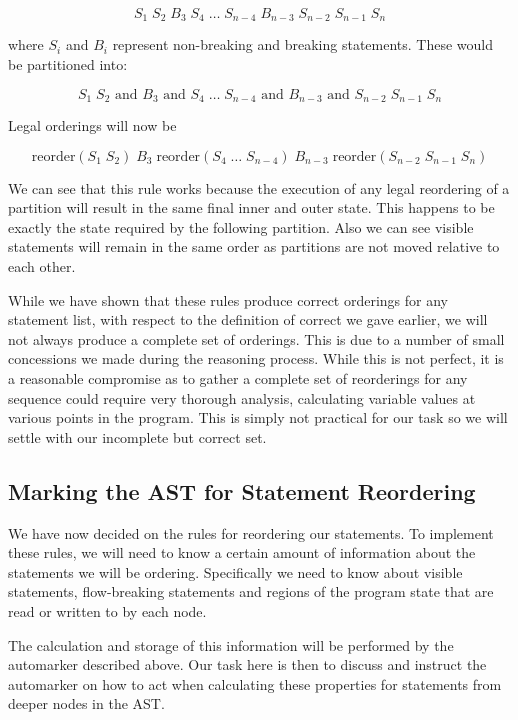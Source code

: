 \documentclass[twoside,a4paper]{report}
\begin{document}
$$S_1 \; S_2 \; B_3 \; S_4 \; \ldots \; S_{n-4} \; B_{n-3} \; S_{n-2} \; S_{n-1} \; S_n$$

where $S_i$ and $B_i$ represent non-breaking and breaking statements. These would be partitioned into:

$$S_1 \; S_2 \text{ and } B_3 \text{ and } S_4 \; \ldots \; S_{n-4} \text{ and } B_{n-3} \text{ and } S_{n-2} \; S_{n-1} \; S_n$$

Legal orderings will now be

$$\text{reorder}(S_1 \; S_2) \; B_3 \; \text{reorder}(S_4 \; \ldots \; S_{n-4}) \; B_{n-3} \; \text{reorder}(S_{n-2} \; S_{n-1} \; S_n)$$

We can see that this rule works because the execution of any legal reordering of a partition will result in the same final inner and outer state.
This happens to be exactly the state required by the following partition. Also we can see visible statements will remain in the same order as
partitions are not moved relative to each other.

While we have shown that these rules produce correct orderings for any statement list, with respect to the definition of correct we gave earlier,
we will not always produce a complete set of orderings. This is due to a number of small concessions we made during the reasoning process. While
this is not perfect, it is a reasonable compromise as to gather a complete set of reorderings for any sequence could require very thorough analysis,
calculating variable values at various points in the program. This is simply not practical for our task so we will settle with our incomplete but
correct set.

\subsection{Marking the AST for Statement Reordering}

We have now decided on the rules for reordering our statements. To implement these rules, we will need to know a certain amount of information about
the statements we will be ordering. Specifically we need to know about visible statements, flow-breaking statements and regions of the program
state that are read or written to by each node.

The calculation and storage of this information will be performed by the automarker described above. Our task here is then to discuss and instruct
the automarker on how to act when calculating these properties for statements from deeper nodes in the AST.
\end{document}
